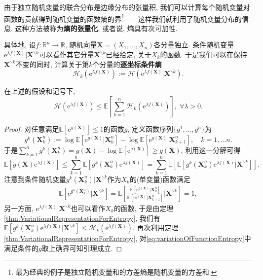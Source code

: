由于独立随机变量的联合分布是边缘分布的张量积, 我们可以计算每个随机变量对函数的贡献得到随机变量的函数熵的界\footnote{最为经典的例子是独立随机变量和的方差熵是随机变量的方差和.}——这样我们就利用了随机变量分布的信息. 
这种方法被称为\textbf{熵的张量化}, 或者说, 熵具有次可加性.


具体地, 设$f \colon \mathbb{R}^n \to \mathbb{R}$, 随机向量$\bm{X} = (X_1, \dots, X_n)$各分量独立. 
条件随机变量$\mathrm{e}^{\lambda f(\bm{X})} | \bm{X}^{\backslash k}$可以看作其它分量$\bm{X}^{\backslash k}$已经给定, 关于$X_k$的函数. 
于是我们可以在保持$\bm{X}^{\backslash k}$不变的同时, 计算关于第$k$个分量的\textbf{逐坐标条件熵}
\begin{equation*}
	\mathcal{H}_k ( \mathrm{e}^{\lambda f(\bm{X})} )
	:= \mathcal{H} ( \mathrm{e}^{\lambda f(\bm{X})} | \bm{X}^{\backslash k} ). 
\end{equation*}

\begin{lemma}[熵的张量化]\label{lemma:EntropyTensorization}
	在上述的假设和记号下, 
	\begin{equation*}
		\mathcal{H}(\mathrm{e}^{\lambda f(\bm{X})})
		\leq \mathbb{E}\left[ \sum_{k=1}^n \mathcal{H}_k (\mathrm{e}^{\lambda f(\bm{X})}) \right],\; 
		\forall \lambda > 0. 
	\end{equation*}
\end{lemma}
\begin{proof}
	对任意满足$\mathbb{E}[\mathrm{e}^{g(\bm{X})}] \leq 1$的函数$g$, 定义函数序列$\{g^1, \dots, g^n\}$为
	\begin{equation*}
		g^k(\bm{X}_k^n):= \log \mathbb{E}[\mathrm{e}^{g(\bm{X})} | \bm{X}_k^n] - \log \mathbb{E}[\mathrm{e}^{g(\bm{X})} | \bm{X}_{k+1}^n],\quad k = 1, \dots n. 
	\end{equation*}
	于是$\sum_{k=1}^n g^k(\bm{X}_k^n) = g(\bm{X}) - \log \mathbb{E}[ \mathrm{e}^{g(\bm{X})} ] \geq g(\bm{X})$, 利用这一分解可得
	\begin{equation}\label{eq:variationOfFunctionEntropy}
		\mathbb{E}[ g(\bm{X}) \mathrm{e}^{\lambda f(\bm{X})}]
		\leq \sum_{k=1}^n \mathbb{E}[ g^k(\bm{X}_k^n) \mathrm{e}^{\lambda f(\bm{X})} ] 
		= \sum_{k=1}^n \mathbb{E}\left[ \mathbb{E}[ g^k(\bm{X}_k^n) \mathrm{e}^{\lambda f(\bm{X})} | \bm{X}^{\backslash k} ] \right]. 
	\end{equation}
	注意到条件随机变量$g^k(\bm{X}_k^n)|\bm{X}^{\backslash k}$作为$X_k$的(单变量)函数满足
	\begin{align*}
		\mathbb{E}[\mathrm{e}^{g^k(\bm{X}_k^n)}| \bm{X}^{\backslash k}]
		= \mathbb{E} \left[ \frac{\mathbb{E}[\mathrm{e}^{g(\bm{X})} | \bm{X}_k^n]}{\mathbb{E}[\mathrm{e}^{g(\bm{X})} | \bm{X}_{k+1}^n]} \bigg| \bm{X}^{\backslash k} \right]
		= 1, 
	\end{align*}
	另一方面, $\mathrm{e}^{\lambda f(\bm{X})} | \bm{X}^{\backslash k}$也可以看作$X_k$的函数, 于是由定理\ref{thm:VariationalRepresentationForEntropy}, 我们有
	$\mathbb{E}[ g^k(\bm{X}_k^n) \mathrm{e}^{\lambda f(\bm{X})} | \bm{X}^{\backslash k} ] \leq \mathcal{H}_k(\mathrm{e}^{\lambda f(\bm{X})})$. 
	再次利用定理\ref{thm:VariationalRepresentationForEntropy}, 对\eqref{eq:variationOfFunctionEntropy}中满足条件的$g$取上确界可知引理成立. 
\end{proof}

